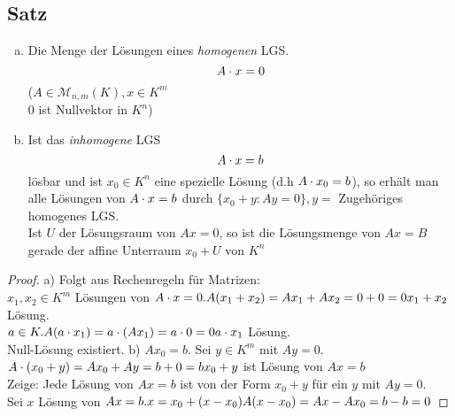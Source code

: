 \subsection{Satz}
\begin{enumerate}[a)]
\item Die Menge der Lösungen eines \emph{homogenen} LGS.
\[A \cdot x = 0\]
($A \in \mathcal{M}_{n,m}(K),x \in K^m$ \\
0 ist Nullvektor in $K^n$)
\item Ist das \emph{inhomogene} LGS $$A \cdot x = b$$ lösbar und ist $x_0 \in K^n$ eine spezielle Lösung (d.h $A \cdot x_0 = b$), so erhält man alle Lösungen von $A \cdot x = b$ durch $\{x_0+y: Ay = 0\}, y=$ Zugehöriges homogenes LGS.\\
Ist $U$ der Lösungsraum von $Ax =0$, so ist die Lösungsmenge von $Ax = B$ gerade der affine Unterraum $x_0 + U$ von $K^n$
\end{enumerate}
\begin{proof}
a) Folgt aus Rechenregeln für Matrizen:\\
$x_1,x_2 \in K^m$ Lösungen von $A \cdot x =0.\\
A(x_1+x_2) =  Ax_1 +Ax_2 = 0 + 0 = 0\\
x_1 + x_2$ Lösung.\\
$a \in K.\\
A(a\cdot x_1) = a \cdot (Ax_1) = a \cdot 0 = 0\\
a \cdot x_1$ Lösung.\\
Null-Lösung existiert.
b) $Ax_0 = b$. Sei $y \in K^m$ mit $Ay=0$.\\
$A\cdot(x_0+y) = Ax_0+Ay = b + 0 = b\\
x_0 + y$ ist Lösung von $Ax = b$\\
Zeige: Jede Lösung von $Ax = b$ ist von der Form $x_0 + y$ für ein $y$ mit $Ay =0$.\\
Sei $x$ Lösung von $Ax =b.\\
x = x_0 + (x-x_0)\\
A(x-x_0) = Ax -Ax_0 = b - b = 0$
\end{proof}
